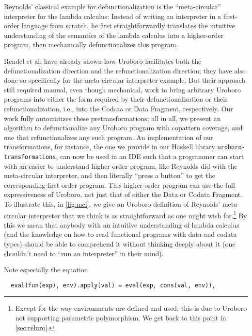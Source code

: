 Reynolds' classical example for defunctionalization is the ``meta-circular'' interpreter for the lambda calculus: Instead of writing an interpreter in a first-order language from scratch, he first straightforwardly translates the intuitive understanding of the semantics of the lambda calculus into a higher-order program, then mechanically defunctionalizes this program.

Rendel et al.\cite{rendel15automatic} have already shown how Uroboro facilitates both the defunctionalization direction and the refunctionalization direction; they have also done so specifically for the meta-circular interpreter example. But their approach still required manual, even though mechanical, work to bring arbitrary Uroboro programs into either the form required by their defunctionalization or their refunctionalization, i.e., into the Codata or Data Fragment, respectively. Our work fully automatizes these pretransformations; all in all, we present an algorithm to defunctionalize any Uroboro program with copattern coverage, and one that refunctionalizes any such program. An implementation of our transformations, for instance, the one we provide in our Haskell library \texttt{uroboro-transformations}, can now be used in an IDE such that a programmer can start with an easier to understand higher-order program, like Reynolds\cite{reynolds72definitional} did with the meta-circular interpreter, and then literally ``press a button'' to get the corresponding first-order program. This higher-order program can use the full expressiveness of Uroboro, not just that of either the Data or Codata Fragment. To illustrate this, in \autoref{fig:mci}, we give an Uroboro definition of Reynolds' meta-circular interpreter that we think is as straightforward as one might wish for.\footnote{Except for the way environments are defined and used; this is due to Uroboro not supporting parametric polymorphism. We get back to this point in \autoref{sec:reluro}.} By this we mean that anybody with an intuitive understanding of lambda calculus (and the knowledge on how to read functional programs with data and codata types) should be able to comprehend it without thinking deeply about it (one shouldn't need to ``run an interpreter'' in their mind).

Note especially the equation

\begin{lstlisting}
  eval(fun(exp), env).apply(val) = eval(exp, cons(val, env)),
\end{lstlisting}

